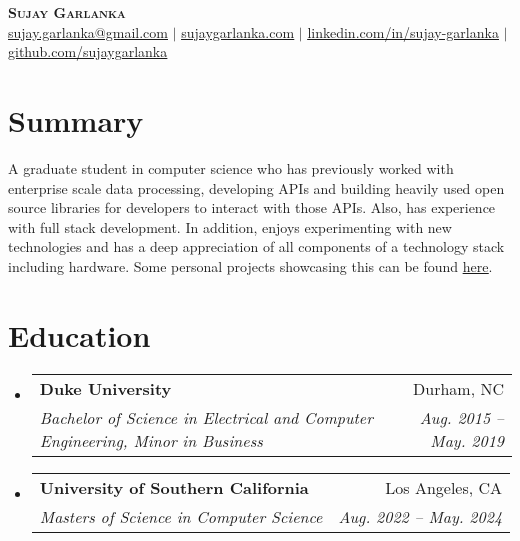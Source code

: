 \documentclass[letterpaper,11pt]{article}
\makeatletter
\newcommand{\resumeSubheading}[4]{
  \vspace{-2pt}\item
    \begin{tabular*}{0.97\textwidth}[t]{l@{\extracolsep{\fill}}r}
      \textbf{#1} & #2 \\
      \textit{\small#3} & \textit{\small #4} \\
    \end{tabular*}\vspace{-7pt}
}
\newcommand{\resumeSubHeadingListStart}{\begin{itemize}[leftmargin=0.15in, label={}]}
\newcommand{\resumeSubHeadingListEnd}{\end{itemize}}
\makeatother
\begin{document}

\begin{center}
    \textbf{\Huge \scshape Sujay Garlanka} \\ \vspace{1pt}
    \href{mailto:x@x.com}
    {\underline{sujay.garlanka@gmail.com}} $|$ 
    \href{https://www.sujaygarlanka.com}
    {\underline{sujaygarlanka.com}} $|$
    \href{https://www.linkedin.com/in/sujay-garlanka/}
    {\underline{linkedin.com/in/sujay-garlanka}} $|$
    \href{https://github.com/sujaygarlanka}
    {\underline{github.com/sujaygarlanka}}
\end{center}

\section{Summary}
    \small A graduate student in computer science who has previously worked with enterprise scale data processing, developing APIs and building heavily used open source libraries for developers to interact with those APIs. Also, has experience with full stack development. In addition, enjoys experimenting with new technologies and has a deep appreciation of all components of a technology stack including hardware. Some personal projects showcasing this can be found \href{https://sujaygarlanka.com/projects.html}{\underline{here}}.

\section{Education}
  \resumeSubHeadingListStart
    \resumeSubheading
      {Duke University}{Durham, NC}
      {Bachelor of Science in Electrical and Computer Engineering, Minor in Business}{Aug. 2015 -- May. 2019}
    \resumeSubheading
      {University of Southern California}{Los Angeles, CA}
      {Masters of Science in Computer Science}{Aug. 2022 -- May. 2024}
  \resumeSubHeadingListEnd


\end{document}
